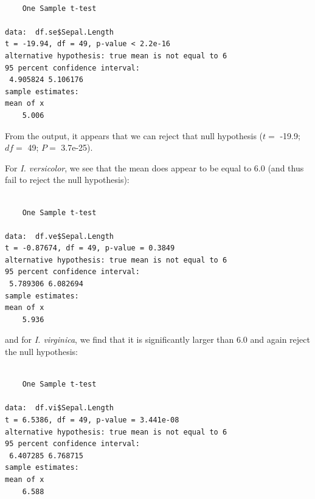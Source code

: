 \documentclass[
  letterpaper,
]{book}
\newenvironment{Shaded}{\begin{snugshade}}{\end{snugshade}}
\newcommand{\AttributeTok}[1]{\textcolor[rgb]{0.40,0.45,0.13}{#1}}
\newcommand{\FloatTok}[1]{\textcolor[rgb]{0.68,0.00,0.00}{#1}}
\newcommand{\FunctionTok}[1]{\textcolor[rgb]{0.28,0.35,0.67}{#1}}
\newcommand{\NormalTok}[1]{\textcolor[rgb]{0.00,0.23,0.31}{#1}}
\newcommand{\SpecialCharTok}[1]{\textcolor[rgb]{0.37,0.37,0.37}{#1}}
\begin{document}
\begin{verbatim}

    One Sample t-test

data:  df.se$Sepal.Length
t = -19.94, df = 49, p-value < 2.2e-16
alternative hypothesis: true mean is not equal to 6
95 percent confidence interval:
 4.905824 5.106176
sample estimates:
mean of x 
    5.006 
\end{verbatim}

From the output, it appears that we can reject that null hypothesis
(\(t =\) -19.9; \(df =\) 49; \(P =\) 3.7e-25).

For \emph{I. versicolor}, we see that the mean does appear to be equal
to 6.0 (and thus fail to reject the null hypothesis):

\begin{Shaded}
\end{Shaded}

\begin{verbatim}

    One Sample t-test

data:  df.ve$Sepal.Length
t = -0.87674, df = 49, p-value = 0.3849
alternative hypothesis: true mean is not equal to 6
95 percent confidence interval:
 5.789306 6.082694
sample estimates:
mean of x 
    5.936 
\end{verbatim}

and for \emph{I. virginica}, we find that it is significantly larger
than 6.0 and again reject the null hypothesis:

\begin{Shaded}
\end{Shaded}

\begin{verbatim}

    One Sample t-test

data:  df.vi$Sepal.Length
t = 6.5386, df = 49, p-value = 3.441e-08
alternative hypothesis: true mean is not equal to 6
95 percent confidence interval:
 6.407285 6.768715
sample estimates:
mean of x 
    6.588 
\end{verbatim}
\end{document}
